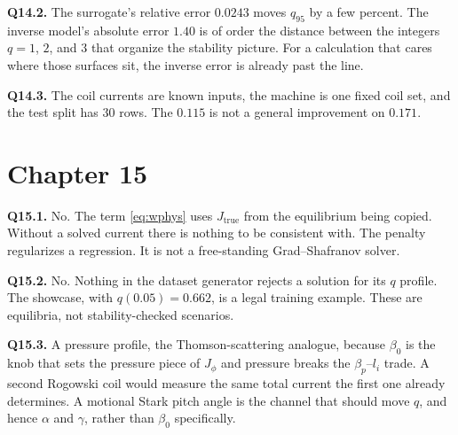 \documentclass[11pt,a4paper,oneside,openany]{book}
\numberwithin{equation}{chapter}
\theoremstyle{definition}
\begin{document}
\textbf{Q14.2.} The surrogate's relative error \(0.0243\) moves \(q_{95}\) by a few percent. The inverse model's absolute error \(1.40\) is of order the distance between the integers \(q=1\), \(2\), and \(3\) that organize the stability picture. For a calculation that cares where those surfaces sit, the inverse error is already past the line.

\textbf{Q14.3.} The coil currents are known inputs, the machine is one fixed coil set, and the test split has \(30\) rows. The \(0.115\) is not a general improvement on \(0.171\).

\section*{Chapter 15}

\textbf{Q15.1.} No. The term \eqref{eq:wphys} uses \(J_{\mathrm{true}}\) from the equilibrium being copied. Without a solved current there is nothing to be consistent with. The penalty regularizes a regression. It is not a free-standing Grad--Shafranov solver.

\textbf{Q15.2.} No. Nothing in the dataset generator rejects a solution for its \(q\) profile. The showcase, with \(q(0.05)=0.662\), is a legal training example. These are equilibria, not stability-checked scenarios.

\textbf{Q15.3.} A pressure profile, the Thomson-scattering analogue, because \(\beta_{0}\) is the knob that sets the pressure piece of \(J_{\phi}\) and pressure breaks the \(\beta_{p}\)--\(l_{i}\) trade. A second Rogowski coil would measure the same total current the first one already determines. A motional Stark pitch angle is the channel that should move \(q\), and hence \(\alpha\) and \(\gamma\), rather than \(\beta_{0}\) specifically.
\end{document}

